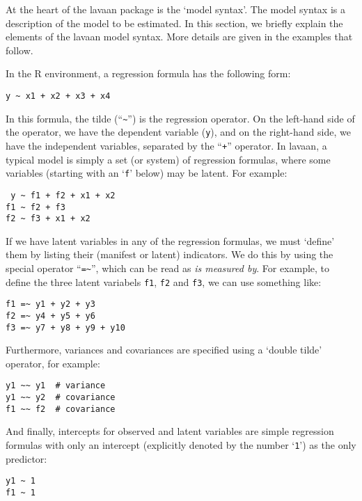At the heart of the lavaan package is the `model syntax'. The model
syntax is a description of the model to be estimated. In this section,
we briefly explain the elements of the lavaan model syntax. More details
are given in the examples that follow.

In the R environment, a regression formula has the following form:

\begin{verbatim}
y ~ x1 + x2 + x3 + x4
\end{verbatim}

In this formula, the tilde (``\texttt{\textasciitilde{}}'') is the
regression operator. On the left-hand side of the operator, we have the
dependent variable (\texttt{y}), and on the right-hand side, we have the
independent variables, separated by the ``\texttt{+}'' operator. In
lavaan, a typical model is simply a set (or system) of regression
formulas, where some variables (starting with an `\texttt{f}' below) may
be latent. For example:

\begin{verbatim}
 y ~ f1 + f2 + x1 + x2 
f1 ~ f2 + f3 
f2 ~ f3 + x1 + x2
\end{verbatim}

If we have latent variables in any of the regression formulas, we must
`define' them by listing their (manifest or latent) indicators. We do
this by using the special operator ``\texttt{=\textasciitilde{}}'',
which can be read as \emph{is measured by}. For example, to define the
three latent variabels \texttt{f1}, \texttt{f2} and \texttt{f3}, we can
use something like:

\begin{verbatim}
f1 =~ y1 + y2 + y3 
f2 =~ y4 + y5 + y6 
f3 =~ y7 + y8 + y9 + y10
\end{verbatim}

Furthermore, variances and covariances are specified using a `double
tilde' operator, for example:

\begin{verbatim}
y1 ~~ y1  # variance
y1 ~~ y2  # covariance
f1 ~~ f2  # covariance
\end{verbatim}

And finally, intercepts for observed and latent variables are simple
regression formulas with only an intercept (explicitly denoted by the
number `\texttt{1}') as the only predictor:

\begin{verbatim}
y1 ~ 1
f1 ~ 1
\end{verbatim}

